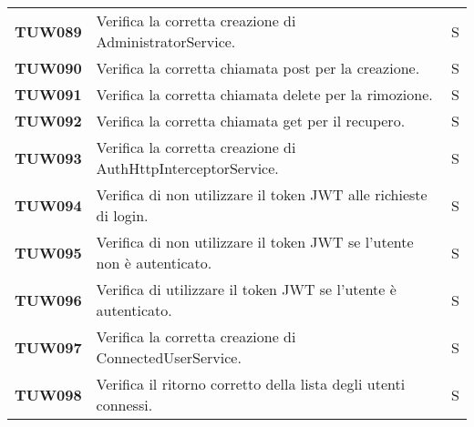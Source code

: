 \documentclass[../../piano-di-qualifica.tex]{subfiles}
\begin{document}
\begin{longtable}[H]{>{\centering\bfseries}m{3cm} >{}m{10cm} >{\centering\arraybackslash}m{3cm}}

  TUW089             & Verifica la corretta creazione di AdministratorService.                                                             & S                             \\

  TUW090             & Verifica la corretta chiamata post per la creazione.                                                                & S                             \\

  TUW091             & Verifica la corretta chiamata delete per la rimozione.                                                              & S                             \\

  TUW092             & Verifica la corretta chiamata get per il recupero.                                                                  & S                             \\


  TUW093             & Verifica la corretta creazione di AuthHttpInterceptorService.                                                       & S                             \\

  TUW094             & Verifica di non utilizzare il token JWT alle richieste di login.                                                    & S                             \\

  TUW095             & Verifica di non utilizzare il token JWT se l'utente non è autenticato.                                              & S                             \\

  TUW096             & Verifica di utilizzare il token JWT se l'utente è autenticato.                                                      & S                             \\


  TUW097             & Verifica la corretta creazione di ConnectedUserService.                                                             & S                             \\

  TUW098             & Verifica il ritorno corretto della lista degli utenti connessi.                                                     & S                             \\


\end{longtable}
\end{document}
